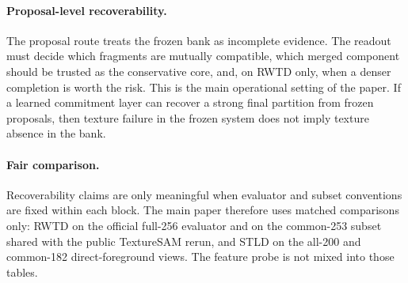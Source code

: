 \paragraph{Proposal-level recoverability.} The proposal route treats the frozen bank as incomplete evidence. The readout must decide which fragments are mutually compatible, which merged component should be trusted as the conservative core, and, on RWTD only, when a denser completion is worth the risk. This is the main operational setting of the paper. If a learned commitment layer can recover a strong final partition from frozen proposals, then texture failure in the frozen system does not imply texture absence in the bank.

\paragraph{Fair comparison.} Recoverability claims are only meaningful when evaluator and subset conventions are fixed within each block. The main paper therefore uses matched comparisons only: RWTD on the official full-256 evaluator and on the common-253 subset shared with the public TextureSAM rerun, and STLD on the all-200 and common-182 direct-foreground views. The feature probe is not mixed into those tables.


